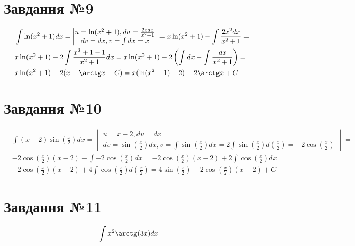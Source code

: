 \documentclass{report}
\begin{document}
\section{Завдання №9}
\begin{equation}\label{eq9}\begin{split}
	& \int\ln(x^2 + 1) dx = \begin{vmatrix}u =\ln(x^2 + 1), du = \frac{2xdx}{x^2 + 1}\\dv=dx, v = \int dx = x\end{vmatrix} = x\ln(x^2 + 1) - \int \frac{2x^2 dx}{x^2 + 1} =\\
	& x\ln(x^2 + 1) - 2\int\frac{x^2 + 1 - 1}{x^2 + 1} dx = x\ln(x^2 + 1) - 2\left(\int dx - \int \frac{dx}{x^2 + 1}\right) =\\
	& x\ln(x^2 + 1) - 2(x - \arctg x + C) = x(\ln(x^2 + 1) - 2) + 2\arctg x + C
\end{split}\end{equation}

\section{Завдання №10}
\begin{equation}\label{eq10}\begin{split}
	& \int(x-2)\sin(\frac{x}{2})dx = \begin{vmatrix}u = x - 2, du = dx\\dv = \sin(\frac{x}{2})dx, v = \int \sin(\frac{x}{2})dx = 2\int \sin(\frac{x}{2})d(\frac{x}{2}) = -2\cos(\frac{x}{2})\end{vmatrix} =\\
	& -2\cos(\frac{x}{2})(x - 2) - \int -2\cos(\frac{x}{2})dx = -2\cos(\frac{x}{2})(x - 2) + 2\int\cos(\frac{x}{2})dx =\\
	&  -2\cos(\frac{x}{2})(x - 2) + 4\int\cos(\frac{x}{2})d(\frac{x}{2}) = 4\sin(\frac{x}{2}) - 2\cos(\frac{x}{2})(x - 2) + C
\end{split}\end{equation}

\section{Завдання №11}
\begin{equation}\label{eq11}\begin{split}
	& \int x^2 \arctg(3x)dx
\end{split}\end{equation}
\end{document}
